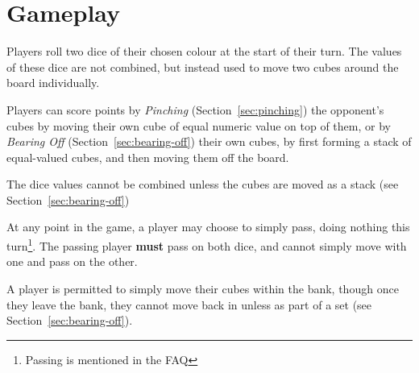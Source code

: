 \section{Gameplay}
Players roll two dice of their chosen colour at the start of their turn.
The values of these dice are not combined, but instead used to move two cubes around the board individually.

Players can score points by \textit{Pinching} (Section~\ref{sec:pinching}) the opponent's cubes by moving their own cube of equal numeric value on top of them, or by \textit{Bearing Off} (Section~\ref{sec:bearing-off}) their own cubes, by first forming a stack of equal-valued cubes, and then moving them off the board.

\note The dice values cannot be combined unless the cubes are moved as a stack (see Section~\ref{sec:bearing-off})

\note At any point in the game, a player may choose to simply pass, doing nothing this turn\footnote{Passing is mentioned in the FAQ}.
The passing player \textbf{must} pass on both dice, and cannot simply move with one and pass on the other.

\note A player is permitted to simply move their cubes within the bank, though once they leave the bank, they cannot move back in unless as part of a set (see Section~\ref{sec:bearing-off}).





